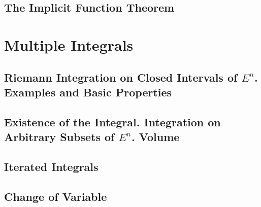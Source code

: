 \documentclass{article}
\begin{document}
		\subsection{The Implicit Function Theorem}
	
	
	\section{Multiple Integrals}
		\subsection{Riemann Integration on Closed Intervals of $E^n$. Examples and Basic Properties}
		
		\subsection{Existence of the Integral. Integration on Arbitrary Subsets of $E^n$. Volume}
		
		\subsection{Iterated Integrals}
		
		\subsection{Change of Variable}

	
\end{document}
